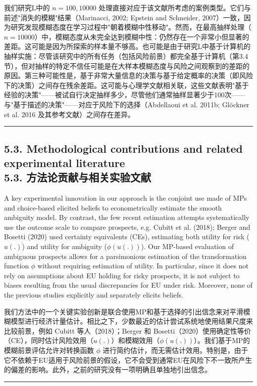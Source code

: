 \documentclass[12pt,a4paper]{article}
\newenvironment{original}
  {\par\vspace{0.5em}\noindent\color{black}\ignorespaces}
  {\par\vspace{0.3em}}
\newenvironment{translation}
  {\par\noindent\color{transblue}\ignorespaces}
  {\par\vspace{0.8em}\hrule\vspace{0.5em}}
\newcommand{\bilingualsubsection}[2]{%
  \subsection{\texorpdfstring{#1 \\[0.2em] {\normalsize\color{transblue}#2}}{#1}}
}
\begin{document}
\begin{translation}
我们研究L中的 $n = 100, 10000$ 处理直接对应于该文献所考虑的案例类型。它们与前述"消失的模糊"结果（Marinacci, 2002; Epstein and Schneider, 2007）一致，因为研究发现模糊态度在学习过程中"朝着模糊中性移动"。然而，在最高抽样处理（$n = 10000$）中，模糊态度从未完全达到模糊中性：仍然存在一个非常小但显著的差距。这可能是因为所探索的样本量不够高。也可能是由于研究L中基于计算机的抽样实施：尽管该研究中的所有任务（包括风险前景）都完全基于计算机（第3.4节），但对抽样的特定不信任可能是在大样本模糊态度与风险之间观察到的差距的原因。第三种可能性是，基于非常大量信息的决策与基于给定概率的决策（即风险下的决策）之间存在残余差距。这可能与心理学文献相关联，这些文献表明"基于经验的决策"——被试自行决定抽样多少，尽管他们通常抽样显著少于100次——与"基于描述的决策"——对应于风险下的选择（Abdellaoui et al. 2011b; Gl\"{o}ckner et al. 2016 及其参考文献）之间存在差异。
\end{translation}

\bilingualsubsection{5.3. Methodological contributions and related experimental literature}{5.3. 方法论贡献与相关实验文献}

\begin{original}
A key experimental innovation in our approach is the conjoint use made of MPs and choice-based elicited beliefs to econometrically estimate the smooth ambiguity model. By contrast, the few recent estimation attempts systematically use the outcome scale to compare prospects, e.g. Cubitt et al. (2018); Berger and Bosetti (2020) used certainty equivalents (CEs), estimating both utility for risk ($u(.)$) and utility for ambiguity ($\phi(u(.))$). Our MP-based evaluation of ambiguous prospects allows for a parsimonious estimation of the transformation function $\phi$ without requiring estimation of utility. In particular, since it does not rely on assumptions about EU holding for risky prospects, it is not subject to biases resulting from the usual discrepancies for EU under risk. Moreover, none of the previous studies explicitly and separately elicits beliefs.
\end{original}

\begin{translation}
我们方法中的一个关键实验创新是联合使用MP和基于选择的引出信念来对平滑模糊模型进行经济计量估计。相比之下，少数最近的估计尝试系统地使用结果尺度来比较前景，例如 Cubitt 等人（2018）；Berger 和 Bosetti（2020）使用确定性等价（CE），同时估计风险效用（$u(.)$）和模糊效用（$\phi(u(.))$）。我们基于MP的模糊前景评估允许对转换函数 $\phi$ 进行简约估计，而无需估计效用。特别是，由于它不依赖于EU适用于风险前景的假设，它不会受到通常EU在风险下不一致所产生的偏差的影响。此外，之前的研究没有一项明确且单独地引出信念。
\end{translation}
\end{document}
